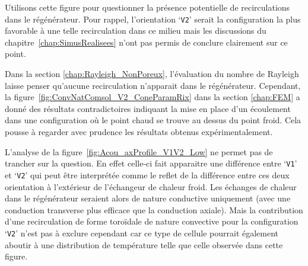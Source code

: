 %

Utilisons cette figure pour questionner la présence potentielle de recirculations dans le régénérateur. Pour rappel, l'orientation `\texttt{V2}' serait la configuration la plus favorable à une telle recirculation dans ce milieu mais les discussions du chapitre~\ref{chap:SimusRealisees} n'ont pas permis de conclure clairement sur ce point.

Dans la section \ref{chap:Rayleigh_NonPoreux}, l'évaluation du nombre de Rayleigh laisse penser qu'aucune recirculation n'apparait dans le régénérateur. Cependant, la figure~\ref{fig:ConvNatComsol_V2_ConeParamRix} dans la section \ref{chap:FEM} a donné des résultats contradictoires indiquant la mise en place d'un écoulement dans une configuration où le point chaud se trouve au dessus du point froid. Cela pousse à regarder avec prudence les résultats obtenus expérimentalement. 

L'analyse de la figure~\ref{fig:Acou_axProfile_V1V2_Low} ne permet pas de trancher sur la question. En effet celle-ci fait apparaitre une différence entre `\texttt{V1}' et `\texttt{V2}' qui peut être interprétée comme le reflet de la différence entre ces deux orientation à l'extérieur de l'échangeur de chaleur froid. Les échanges de chaleur dans le régénérateur seraient alors de nature conductive uniquement (avec une conduction transverse plus efficace que la conduction axiale). Mais la contribution d'une recirculation de forme toroïdale de nature convective pour la configuration `\texttt{V2}' n'est pas à exclure cependant car ce type de cellule pourrait également aboutir à une distribution de température telle que celle observée dans cette figure.  \bigskip

